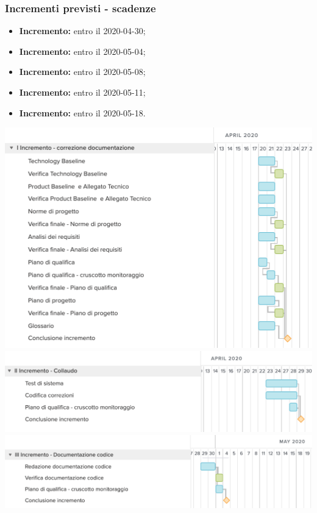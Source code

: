 \subsubsection{Incrementi previsti - scadenze}
\begin{itemize}
	\item \textbf{ Incremento:} entro il 2020-04-30;
	\item \textbf{ Incremento:} entro il 2020-05-04;
	\item \textbf{ Incremento:} entro il 2020-05-08;
	\item \textbf{ Incremento:} entro il 2020-05-11;
	\item \textbf{ Incremento:} entro il 2020-05-18.
\end{itemize}
	\includegraphics[width=\textwidth]{res/img/gantt/RA/1}
	\includegraphics[width=\textwidth]{res/img/gantt/RA/2}
	\includegraphics[width=\textwidth]{res/img/gantt/RA/3}

